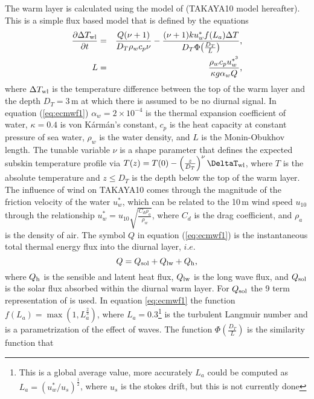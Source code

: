 \documentclass[../tex_main/NEMO_manual]{subfiles}
\begin{document}
The warm layer is calculated using the model of \citet{Takaya_al_JGR10} (TAKAYA10 model hereafter).
This is a simple flux based model that is defined by the equations
\begin{eqnarray}
\frac{\partial{\Delta T_{\rm{wl}}}}{\partial{t}}&=&\frac{Q(\nu+1)}{D_T\rho_w c_p
\nu}-\frac{(\nu+1)ku^*_{w}f(L_a)\Delta T}{D_T\Phi\!\left(\frac{D_T}{L}\right)} \mbox{,}
\label{eq:ecmwf1} \\
L&=&\frac{\rho_w c_p u^{*^3}_{w}}{\kappa g \alpha_w Q }\mbox{,}\label{eq:ecmwf2}
\end{eqnarray}
where $\Delta T_{\rm{wl}}$ is the temperature difference between the top of the warm layer and the depth $D_T=3$\,m at which there is assumed to be no diurnal signal.
In equation (\autoref{eq:ecmwf1}) $\alpha_w=2\times10^{-4}$ is the thermal expansion coefficient of water,
$\kappa=0.4$ is von K\'{a}rm\'{a}n's constant, $c_p$ is the heat capacity at constant pressure of sea water,
$\rho_w$ is the water density, and $L$ is the Monin-Obukhov length.
The tunable variable $\nu$ is a shape parameter that defines the expected subskin temperature profile via
$T(z)=T(0)-\left(\frac{z}{D_T}\right)^\nu\DeltaT_{\rm{wl}}$,
where $T$ is the absolute temperature and $z\le D_T$ is the depth below the top of the warm layer.
The influence of wind on TAKAYA10 comes through the magnitude of the friction velocity of the water $u^*_{w}$,
which can be related to the 10\,m wind speed $u_{10}$ through
the relationship $u^*_{w} = u_{10}\sqrt{\frac{C_d\rho_a}{\rho_w}}$, where $C_d$ is the drag coefficient,
and $\rho_a$ is the density of air.
The symbol $Q$ in equation (\autoref{eq:ecmwf1}) is the instantaneous total thermal energy flux into
the diurnal layer, $i.e.$
\begin{equation}
Q = Q_{\rm{sol}} + Q_{\rm{lw}} + Q_{\rm{h}}\mbox{,} \label{eq:e_flux_eqn}
\end{equation}
where $Q_{\rm{h}}$ is the sensible and latent heat flux, $Q_{\rm{lw}}$ is the long wave flux,
and $Q_{\rm{sol}}$ is the solar flux absorbed within the diurnal warm layer.
For $Q_{\rm{sol}}$ the 9 term representation of \citet{Gentemann_al_JGR09} is used.
In equation \autoref{eq:ecmwf1} the function $f(L_a)=\max(1,L_a^{\frac{2}{3}})$,
where $L_a=0.3$\footnote{
  This is a global average value, more accurately $L_a$ could be computed as $L_a=(u^*_{w}/u_s)^{\frac{1}{2}}$,
  where $u_s$ is the stokes drift, but this is not currently done
} is the turbulent Langmuir number and is a parametrization of the effect of waves.
The function $\Phi\!\left(\frac{D_T}{L}\right)$ is the similarity function that
\end{document}
